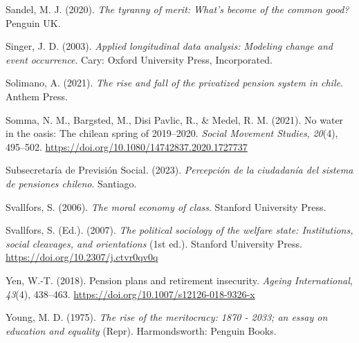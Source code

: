 \documentclass[
  12pt,
]{article}
\newlength{\cslhangindent}
\newenvironment{CSLReferences}[2] %
 {\begin{list}{}{%
  \setlength{\itemindent}{0pt}
  \setlength{\leftmargin}{0pt}
  \setlength{\parsep}{0pt}
  \ifodd #1
   \setlength{\leftmargin}{\cslhangindent}
   \setlength{\itemindent}{-1\cslhangindent}
  \fi
  \setlength{\itemsep}{#2\baselineskip}}}
 {\end{list}}
\begin{document}
\begin{CSLReferences}{1}{0}
Sandel, M. J. (2020). \emph{The tyranny of merit: What's become of the
common good?} Penguin UK.

Singer, J. D. (2003). \emph{Applied longitudinal data analysis: Modeling
change and event occurrence}. Cary: Oxford University Press,
Incorporated.

Solimano, A. (2021). \emph{The rise and fall of the privatized pension
system in chile}. Anthem Press.

Somma, N. M., Bargsted, M., Disi Pavlic, R., \& Medel, R. M. (2021). No
water in the oasis: The chilean spring of 2019--2020. \emph{Social
Movement Studies}, \emph{20}(4), 495--502.
\url{https://doi.org/10.1080/14742837.2020.1727737}

Subsecretaría de Previsión Social. (2023). \emph{Percepción de la
ciudadanía del sistema de pensiones chileno}. Santiago.

Svallfors, S. (2006). \emph{The moral economy of class}. Stanford
University Press.

Svallfors, S. (Ed.). (2007). \emph{The political sociology of the
welfare state: Institutions, social cleavages, and orientations} (1st
ed.). Stanford University Press.
\url{https://doi.org/10.2307/j.ctvr0qv0q}

Yen, W.-T. (2018). Pension plans and retirement insecurity. \emph{Ageing
International}, \emph{43}(4), 438--463.
\url{https://doi.org/10.1007/s12126-018-9326-x}

Young, M. D. (1975). \emph{The rise of the meritocracy: 1870 - 2033; an
essay on education and equality} (Repr). Harmondsworth: Penguin Books.

\end{CSLReferences}
\end{document}
